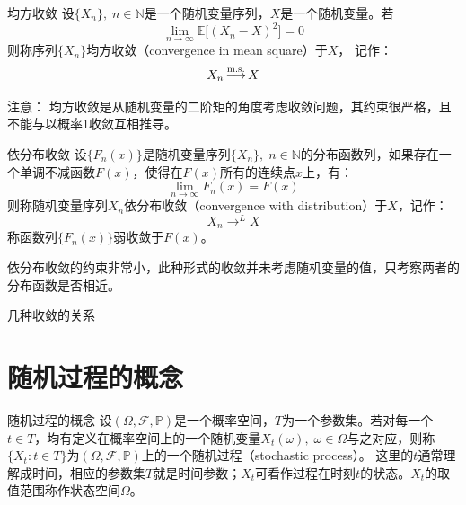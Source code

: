 \documentclass[t]{beamer}
\renewcommand{\Pr}{\mathbb{P}}
\newcommand{\E}{\mathbb{E}}
\begin{document}
  \begin{frame}{均方收敛}
    设$\{X_n\},\; n\in\mathbb{N}$是一个随机变量序列，$X$是一个随机变量。若
    \[\lim_{n\to\infty}\E\big[(X_n-X)^2\big]=0 \]
    则称序列$\{X_n\}$均方收敛（convergence in mean square）于$X$，
    记作：
    \[X_n\mathop{\longrightarrow}^{\rm m.s.} X\]
  
    \begin{block}{注意：}     
均方收敛是从随机变量的二阶矩的角度考虑收敛问题，其约束很严格，且不能与以概率1收敛互相推导。
    \end{block}
  \end{frame}



  \begin{frame}{依分布收敛}
    设$\{F_n(x)\}$是随机变量序列$\{X_n\},\;
    n\in\mathbb{N}$的分布函数列，如果存在一个单调不减函数$F(x)$，使得在$F(x)$所有的连续点$x$上，有：
    \[\lim_{n\to\infty}F_n(x)=F(x) \]
    则称随机变量序列$X_n$依分布收敛（convergence with distribution）于$X$，记作：
    \[X_n\mathop{\longrightarrow}^L X \]
    称函数列$\{F_n(x)\}$弱收敛于$F(x)$。
  
    \begin{block}{}
      依分布收敛的约束非常小，此种形式的收敛并未考虑随机变量的值，只考察两者的分布函数是否相近。
    \end{block}
  \end{frame}


  \begin{frame}{几种收敛的关系}
    \centering
  
  \end{frame}
  

  \section{随机过程的概念}
  \begin{frame}{随机过程的概念}
    设$(\Omega,\mathcal{F},\Pr)$是一个概率空间，$T$为一个参数集。若对每一个$t\in
    T$，均有定义在概率空间上的一个随机变量$X_t(\omega),\;
    \omega\in\Omega$与之对应，则称$\{X_t:t\in
    T\}$为$(\Omega,\mathcal{F},\Pr)$上的一个随机过程（stochastic process）。
    这里的$t$通常理解成时间，相应的参数集$T$就是时间参数；$X_t$可看作过程在时刻$t$的状态。$X_t$的取值范围称作状态空间$\Omega$。
    
  
  \end{frame}
\end{document}
